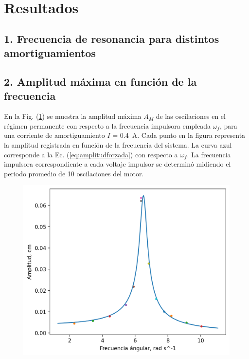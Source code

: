\section*{Resultados}
\subsection*{1. Frecuencia de resonancia para distintos amortiguamientos}

\vspace{1cm}



\subsection*{2. Amplitud máxima en función de la frecuencia}

En la Fig. (\ref{fig:amplitudfrecuencia}) se muestra la amplitud máxima $A_M$ de las 
oscilaciones en el régimen permanente con respecto a la frecuencia impulsora empleada 
$\omega_f$, para una corriente de amortiguamiento $I$ = \qty{0,4}{\ampere}. Cada punto en la
figura representa la amplitud registrada en función de la frecuencia del sistema. La curva 
azul corresponde a la Ec. (\ref{eq:amplitudforzada}) con respecto a $\omega_f$. La frecuencia
impulsora correspondiente a cada voltaje impulsor se determinó midiendo el periodo promedio de
10 oscilaciones del motor.
\begin{figure}[H]
	\centering
	\includegraphics[width=\linewidth]{results/res/reso.png}
	\label{fig:amplitudfrecuencia}
\end{figure}